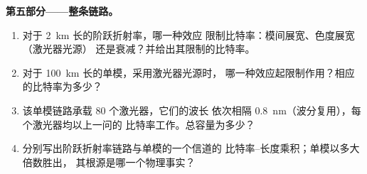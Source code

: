 \begin{problem}
\medskip
\noindent\textbf{第五部分——整条链路。}
\begin{enumerate}[resume]
  \item 对于 \qty{2}{km} 长的阶跃折射率，哪一种效应
        限制比特率：模间展宽、色度展宽（激光器光源）
        还是衰减？并给出其限制的比特率。
  \item 对于 \qty{100}{km} 长的单模，采用激光器光源时，
        哪一种效应起限制作用？相应的比特率为多少？
  \item 该单模链路承载 $80$ 个激光器，它们的波长
        依次相隔 \qty{0.8}{nm}（波分复用），每个激光器均以上一问的
        比特率工作。总容量为多少？
  \item 分别写出阶跃折射率链路与单模的一个信道的
        比特率–长度乘积；单模以多大倍数胜出，
        其根源是哪一个物理事实？
\end{enumerate}
\end{problem}
